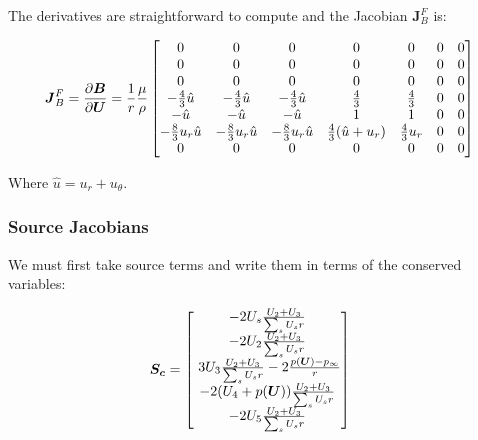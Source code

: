 \documentclass[10pt]{article}
\begin{document}
\begin{flushleft}
The derivatives are straightforward to compute and the Jacobian $\boldsymbol{J}_B^F$ is:

\begin{equation}
    \boldsymbol{J}_B^F = \frac{\partial \boldsymbol{B}}{\partial \boldsymbol{U}} = \frac{1}{r} \frac{\mu}{\rho}
    \begin{bmatrix}
        0 & 0 & 0 & 0 & 0 & 0 & 0 \\
        0 & 0 & 0 & 0 & 0 & 0 & 0 \\
        0 & 0 & 0 & 0 & 0 & 0 & 0 \\
        -\frac{4}{3} \hat{u} & -\frac{4}{3} \hat{u} & -\frac{4}{3} \hat{u} & \frac{4}{3} & \frac{4}{3} & 0 & 0 \\ 
        -\hat{u} & -\hat{u} & -\hat{u} & 1 & 1 & 0 & 0 \\
        -\frac{8}{3} u_r \hat{u} & -\frac{8}{3} u_r \hat{u} & -\frac{8}{3} u_r \hat{u} & \frac{4}{3} (\hat{u} + u_r) & \frac{4}{3} u_r & 0 & 0 \\
        0 & 0 & 0 & 0 & 0 & 0 & 0
    \end{bmatrix}
\end{equation}

Where $\hat{u} = u_r + u_\theta$.

\subsubsection{Source Jacobians}

We must first take source terms and write them in terms of the conserved variables:

\begin{equation*}
    \boldsymbol{S_c} =
        \begin{bmatrix}
        -2 U_s \frac{U_2 + U_3}{\sum_s U_s r} \\ -2 U_2 \frac{U_2 + U_3}{\sum_s U_s r} \\ \ 3 U_3 \frac{U_2 + U_3}{\sum_s U_s r} - 2 \frac{p(\boldsymbol{U})-p_\infty}{r} \\ -2 (U_4 + p(\boldsymbol{U})) \frac{U_2 + U_3}{\sum_s U_s r} \\ -2 U_5 \frac{U_2 + U_3}{\sum_s U_s r}
        \end{bmatrix}
    \hspace{5mm}
\end{equation*}


\end{flushleft}
\end{document}
